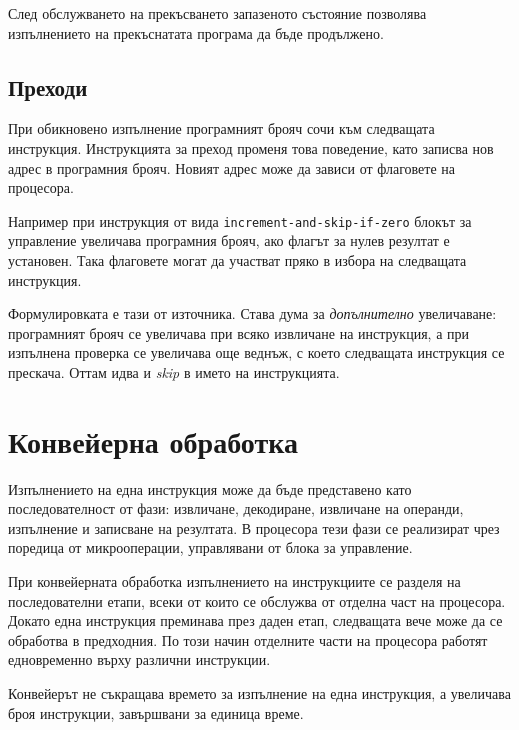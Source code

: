 След обслужването на прекъсването запазеното състояние позволява изпълнението на прекъснатата програма да бъде продължено.

\subsection{Преходи}\label{s:9.4.7}

При обикновено изпълнение програмният брояч сочи към следващата инструкция. Инструкцията за преход променя това поведение, като записва нов адрес в програмния брояч. Новият адрес може да зависи от флаговете на процесора.

Например при инструкция от вида \verb|increment-and-skip-if-zero| блокът за управление увеличава програмния брояч, ако флагът за нулев резултат е установен. Така флаговете могат да участват пряко в избора на следващата инструкция.

\begin{supp}[Бележка]
Формулировката е тази от източника. Става дума за \emph{допълнително} увеличаване: програмният брояч се увеличава при всяко извличане на инструкция, а при изпълнена проверка се увеличава още веднъж, с което следващата инструкция се прескача. Оттам идва и \emph{skip} в името на инструкцията.
\end{supp}

\section{Конвейерна обработка}\label{s:9.5}

Изпълнението на една инструкция може да бъде представено като последователност от фази: извличане, декодиране, извличане на операнди, изпълнение и записване на резултата. В процесора тези фази се реализират чрез поредица от микрооперации, управлявани от блока за управление.

\begin{defn}
При конвейерната обработка изпълнението на инструкциите се разделя на последователни етапи, всеки от които се обслужва от отделна част на процесора. Докато една инструкция преминава през даден етап, следващата вече може да се обработва в предходния. По този начин отделните части на процесора работят едновременно върху различни инструкции.

Конвейерът не съкращава времето за изпълнение на една инструкция, а увеличава броя инструкции, завършвани за единица време.
\end{defn}

